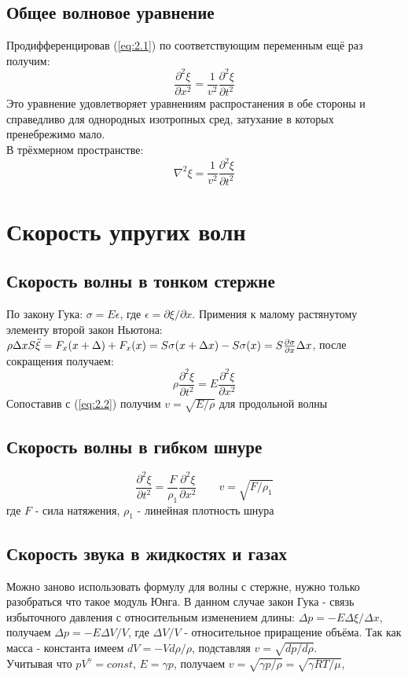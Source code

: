 \documentclass{article}
\begin{document}
\subsection{Общее волновое уравнение}
Продифференцировав (\ref{eq:2.1}) по соответствующим переменным ещё раз получим:
\begin{equation} \label {eq:2.2}
  \frac{\partial^{2}\xi}{\partial x^{2}}=\frac{1}{v^{2}}\frac{\partial^{2}\xi}{\partial t^{2}}
\end{equation}
Это уравнение удовлетворяет уравнениям распростанения в обе стороны и справедливо для однородных изотропных сред,
затухание в которых пренебрежимо мало. \\
В трёхмерном пространстве: 
\[
  \nabla^{2}\xi=\frac{1}{v^{2}}\frac{\partial^{2}\xi}{\partial t^{2}}
\]

\section{Скорость упругих волн}
\subsection{Скорость волны в тонком стержне} \label{subs:rod_speed}
По закону Гука: $\sigma=E\epsilon$, где $\epsilon=\partial\xi/\partial x$.
Примения к малому растянутому элементу второй закон Ньютона:
$\rho \Delta x S \ddot \xi =F_x(x+\Delta)+F_x(x)=S\sigma(x+\Delta x)-S\sigma(x)=S\frac{\partial{\sigma}}{\partial{x}}\Delta x$,
после сокращения получаем:
\[
  \rho \frac{\partial^{2}\xi}{\partial t^{2}}=E\frac{\partial^{2}\xi}{\partial x^{2}}
\]
Сопоставив с (\ref{eq:2.2}) получим $v=\sqrt{E/\rho}$ для продольной волны
\subsection{Скорость волны в гибком шнуре}
\begin{equation} \label {eq:wire_wave}
  \frac{\partial^{2}\xi}{\partial t^{2}}=\frac{F}{\rho_1}\frac{\partial^{2}\xi}{\partial x^{2}}
  \qquad v=\sqrt{F/\rho_1}
\end{equation}
где $F$ - сила натяжения, $\rho_1$ - линейная плотность шнура
\subsection{Скорость звука в жидкостях и газах}
Можно заново использовать формулу для волны с стержне, нужно только разобраться что
такое модуль Юнга. В данном случае закон Гука - связь избыточного давления с относительным
изменением длины: $\Delta p=-E \Delta\xi/\Delta x$, получаем $\Delta p = -E \Delta V/V$,
где $\Delta V/V$ - относительное приращение объёма. Так как масса - константа имеем
$dV=-V d\rho/\rho$, подставляя $v=\sqrt{dp/d\rho}$. \\ 
Учитывая что $pV^{\gamma}=const$, $E=\gamma p$, получаем $v=\sqrt{\gamma p/\rho}=\sqrt{\gamma RT/\mu}$,
\end{document}

